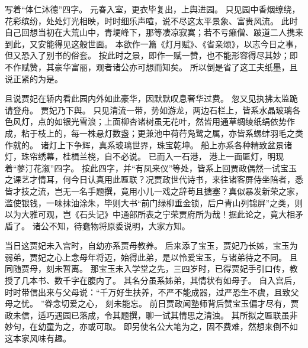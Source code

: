 写着“体仁沐德”四字。
元春入室，更衣毕复出，上舆进园。
只见园中香烟缭绕，花彩缤纷，处处灯光相映，时时细乐声喧，说不尽这太平景象、富贵风流。
此时自己回想当初在大荒山中，青埂峰下，那等凄凉寂寞；若不亏癞僧、跛道二人携来到此，又安能得见这般世面。
本欲作一篇《灯月赋》、《省亲颂》，以志今日之事，但又恐入了别书的俗套。
按此时之景，即作一赋一赞，也不能形容得尽其妙；即不作赋赞，其豪华富丽，观者诸公亦可想而知矣。
所以倒是省了这工夫纸墨，且说正紧的为是。
\par
且说贾妃在轿内看此园内外如此豪华，因默默叹息奢华过费。
忽又见执拂太监跪请登舟。
贾妃乃下舆。
只见清流一带，势如游龙，两边石栏上，皆系水晶玻璃各色风灯，点的如银光雪浪；上面柳杏诸树虽无花叶，然皆用通草绸绫纸绢依势作成，粘于枝上的，每一株悬灯数盏；更兼池中荷荇凫鹭之属，亦皆系螺蚌羽毛之类作就的。
诸灯上下争辉，真系玻璃世界，珠宝乾坤。
船上亦系各种精致盆景诸灯，珠帘绣幕，桂楫兰桡，自不必说。
已而入一石港，
港上一面匾灯，明现着“蓼汀花溆”四字。
按此四字，并“有凤来仪”等处，皆系上回贾政偶然一试宝玉之课艺才情耳，何今日认真用此匾联？况贾政世代诗书，来往诸客屏侍坐陪者，悉皆才技之流，岂无一名手题撰，竟用小儿一戏之辞苟且搪塞？真似暴发新荣之家，滥使银钱，一味抹油涂朱，毕则大书“前门绿柳垂金锁，后户青山列锦屏”之类，则以为大雅可观，岂《石头记》中通部所表之宁荣贾府所为哉！据此论之，竟大相矛盾了。
诸公不知，待蠢物将原委说明，大家方知。
\par
当日这贾妃未入宫时，自幼亦系贾母教养。
后来添了宝玉，贾妃乃长姊，宝玉为弱弟，贾妃之心上念母年将迈，始得此弟，是以怜爱宝玉，与诸弟待之不同。
且同随贾母，刻未暂离。
那宝玉未入学堂之先，三四岁时，已得贾妃手引口传，教授了几本书、数千字在腹内了。
其名分虽系姊弟，其情状有如母子。
自入宫后，时时带信出来与父母说：“千万好生扶养，不严不能成器，过严恐生不虞，且致父母之忧。
”眷念切爱之心，
刻未能忘。
前日贾政闻塾师背后赞宝玉偏才尽有，贾政未信，适巧遇园已落成，令其题撰，聊一试其情思之清浊。
其所拟之匾联虽非妙句，在幼童为之，亦或可取。
即另使名公大笔为之，固不费难，然想来倒不如这本家风味有趣。
